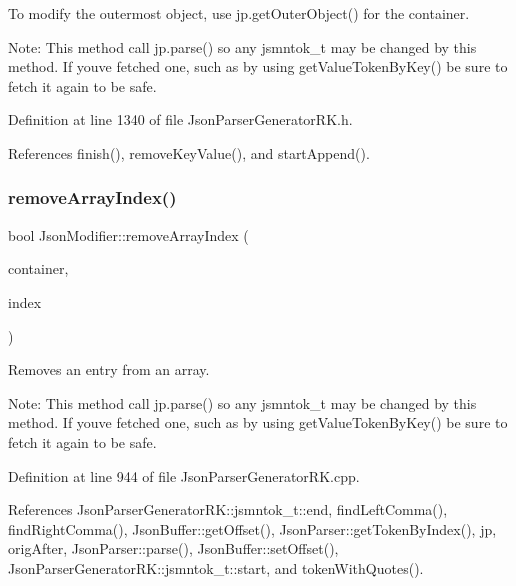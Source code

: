 To modify the outermost object, use jp.\+get\+Outer\+Object() for the container.

Note\+: This method call jp.\+parse() so any jsmntok\+\_\+t may be changed by this method. If you\textquotesingle{}ve fetched one, such as by using get\+Value\+Token\+By\+Key() be sure to fetch it again to be safe. 

Definition at line 1340 of file Json\+Parser\+Generator\+R\+K.\+h.



References finish(), remove\+Key\+Value(), and start\+Append().

\mbox{\label{class_json_modifier_aba45c4fe467fa70b837f190986cf190b}} 
\subsubsection{\texorpdfstring{remove\+Array\+Index()}{removeArrayIndex()}}
{\footnotesize\ttfamily bool Json\+Modifier\+::remove\+Array\+Index (\begin{DoxyParamCaption}\item[{const \hyperlink{struct_json_parser_generator_r_k_1_1jsmntok__t}{Json\+Parser\+Generator\+R\+K\+::jsmntok\+\_\+t} $\ast$}]{container,  }\item[{size\+\_\+t}]{index }\end{DoxyParamCaption})}



Removes an entry from an array. 

Note\+: This method call jp.\+parse() so any jsmntok\+\_\+t may be changed by this method. If you\textquotesingle{}ve fetched one, such as by using get\+Value\+Token\+By\+Key() be sure to fetch it again to be safe. 

Definition at line 944 of file Json\+Parser\+Generator\+R\+K.\+cpp.



References Json\+Parser\+Generator\+R\+K\+::jsmntok\+\_\+t\+::end, find\+Left\+Comma(), find\+Right\+Comma(), Json\+Buffer\+::get\+Offset(), Json\+Parser\+::get\+Token\+By\+Index(), jp, orig\+After, Json\+Parser\+::parse(), Json\+Buffer\+::set\+Offset(), Json\+Parser\+Generator\+R\+K\+::jsmntok\+\_\+t\+::start, and token\+With\+Quotes().



